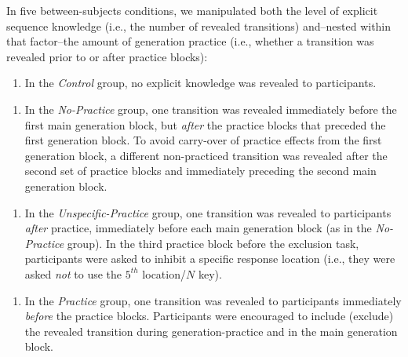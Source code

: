 \documentclass[floatsintext,doc]{apa6}
\providecommand{\tightlist}{%
  \setlength{\itemsep}{0pt}\setlength{\parskip}{0pt}}
\theoremstyle{definition}
\theoremstyle{definition}
\theoremstyle{definition}
\theoremstyle{remark}
\begin{document}
In five between-subjects conditions, we manipulated both the level of
explicit sequence knowledge (i.e., the number of revealed transitions)
and--nested within that factor--the amount of generation practice (i.e.,
whether a transition was revealed prior to or after practice blocks):

\begin{enumerate}
\def\labelenumi{\arabic{enumi}.}
\tightlist
\item
  In the \emph{Control} group, no explicit knowledge was revealed to
  participants.
\end{enumerate}

\begin{enumerate}
\def\labelenumi{\arabic{enumi}.}
\setcounter{enumi}{1}
\tightlist
\item
  In the \emph{No-Practice} group, one transition was revealed
  immediately before the first main generation block, but \emph{after}
  the practice blocks that preceded the first generation block. To avoid
  carry-over of practice effects from the first generation block, a
  different non-practiced transition was revealed after the second set
  of practice blocks and immediately preceding the second main
  generation block.
\end{enumerate}

\begin{enumerate}
\def\labelenumi{\arabic{enumi}.}
\setcounter{enumi}{2}
\tightlist
\item
  In the \emph{Unspecific-Practice} group, one transition was revealed
  to participants \emph{after} practice, immediately before each main
  generation block (as in the \emph{No-Practice} group). In the third
  practice block before the exclusion task, participants were asked to
  inhibit a specific response location (i.e., they were asked \emph{not}
  to use the \(5^{th}\) location/\(N\) key).
\end{enumerate}

\begin{enumerate}
\def\labelenumi{\arabic{enumi}.}
\setcounter{enumi}{3}
\tightlist
\item
  In the \emph{Practice} group, one transition was revealed to
  participants immediately \emph{before} the practice blocks.
  Participants were encouraged to include (exclude) the revealed
  transition during generation-practice and in the main generation
  block.
\end{enumerate}
\end{document}
